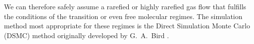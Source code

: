 We can therefore safely assume a rarefied or highly rarefied gas flow that fulfills the conditions of the transition or even free molecular regimes. The simulation method most appropriate for these regimes is the Direct Simulation Monte Carlo (DSMC) method originally developed by G.~A.~Bird \cite{bird1994}.



